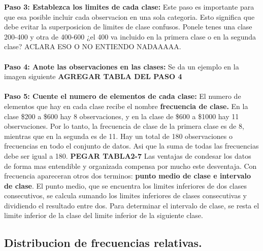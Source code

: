 \documentclass[]{article}
\begin{document}
\textbf{Paso 3: Establezca los limites de cada clase:} Este paso es importante para que esa posible incluir cada observacion en una sola categoria. Esto significa que debe evitar la superposicion de limites de clase confusos. Ponele tenes una clase 200-400 y otra de 400-600 ¿el 400 va incluido en la primera clase o en la segunda clase? ACLARA ESO O NO ENTIENDO NADAAAAA.\\\\
\textbf{Paso 4: Anote las observaciones en las clases:} Se da un ejemplo en la imagen siguiente \textbf{AGREGAR TABLA DEL PASO 4}\\\\
\textbf{Paso 5: Cuente el numero de elementos de cada clase:} El numero de elementos que hay en cada clase recibe el nombre \textbf{frecuencia de clase.} En la clase \$200 a \$600 hay 8 observaciones, y en la clase de \$600 a \$1000 hay 11 observaciones. Por lo tanto, la frecuencia de clase de la primera clase es de 8, mientras que en la segunda es de 11. Hay un total de 180 observaciones o frecuencias en todo el conjunto de datos. Asi que la suma de todas las frecuencias debe ser igual a 180. \textbf{PEGAR TABLA2-7}
Las ventajas de condesar los datos de forma mas entendible y organizada compensa por mucho este desventaja. \linebreak[2]
Con frecuencia apareceran otros dos terminos: \textbf{punto medio de clase e intervalo de clase}. El punto medio, que se encuentra los limites inferiores de dos clases consecutivos, se calcula sumando los limites inferiores de clases consecutivas y dividiendo el resultado entre dos. Para determinar el intervalo de clase, se resta el limite inferior de la clase del limite inferior de la siguiente clase.
\subsection{Distribucion de frecuencias relativas.}
\end{document}
